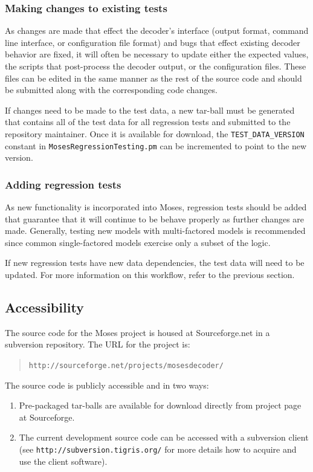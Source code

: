 \documentclass[11pt]{report}
\theoremstyle{plain}
\begin{document}
{\subsubsection{Making changes to existing tests}
As changes are made that effect the decoder's interface (output
format, command line interface, or configuration file format) and
bugs that effect existing decoder behavior are fixed, it will often
be necessary to update either the expected values, the scripts that
post-process the decoder output, or the configuration files.  These
files can be edited in the same manner as the rest of the source
code and should be submitted along with the corresponding code
changes.

If changes need to be made to the test data, a new tar-ball must be
generated that contains all of the test data for all regression
tests and submitted to the repository maintainer.  Once it is
available for download, the \texttt{TEST\_DATA\_VERSION} constant in
\texttt{MosesRegressionTesting.pm} can be incremented to point to
the new version.

\subsubsection{Adding regression tests}
As new functionality is incorporated into Moses, regression tests
should be added that guarantee that it will continue to be behave
properly as further changes are made.  Generally, testing new models
with multi-factored models is recommended since common
single-factored models exercise only a subset of the logic.

If new regression tests have new data dependencies, the test data
will need to be updated.  For more information on this workflow,
refer to the previous section.

\subsection{Accessibility}
The source code for the Moses project is housed at Sourceforge.net
in a subversion repository.  The URL for the project is:

\begin{quote}
    \texttt{http://sourceforge.net/projects/mosesdecoder/}
\end{quote}

The source code is publicly accessible and in two ways:
\begin{enumerate}
  \item Pre-packaged tar-balls are available for download directly
  from project page at Sourceforge.
  \item The current development source code can be accessed with a subversion client (see \texttt{http://subversion.tigris.org/}
for more details how to acquire and use the client software).
\end{enumerate}

}
\end{document}
